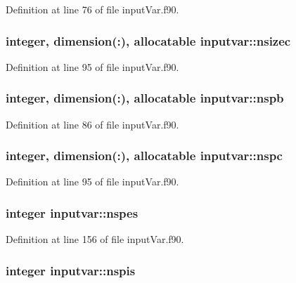 Definition at line 76 of file input\-Var.\-f90.

\hypertarget{classinputvar_af28da5ec88564638bee476f2a37f5308}{
\subsubsection[{nsizec}]{\setlength{\rightskip}{0pt plus 5cm}integer, dimension(\-:), allocatable inputvar\-::nsizec}}\label{classinputvar_af28da5ec88564638bee476f2a37f5308}


Definition at line 95 of file input\-Var.\-f90.

\hypertarget{classinputvar_aa1e78ecd4b3cbb3f08b770cf604a5d3d}{
\subsubsection[{nspb}]{\setlength{\rightskip}{0pt plus 5cm}integer, dimension(\-:), allocatable inputvar\-::nspb}}\label{classinputvar_aa1e78ecd4b3cbb3f08b770cf604a5d3d}


Definition at line 86 of file input\-Var.\-f90.

\hypertarget{classinputvar_aad6ce13b0378ba79e193cb3738e2d938}{
\subsubsection[{nspc}]{\setlength{\rightskip}{0pt plus 5cm}integer, dimension(\-:), allocatable inputvar\-::nspc}}\label{classinputvar_aad6ce13b0378ba79e193cb3738e2d938}


Definition at line 95 of file input\-Var.\-f90.

\hypertarget{classinputvar_a253d7296c6c1f21cd53ed05721bcbbc3}{
\subsubsection[{nspes}]{\setlength{\rightskip}{0pt plus 5cm}integer inputvar\-::nspes}}\label{classinputvar_a253d7296c6c1f21cd53ed05721bcbbc3}


Definition at line 156 of file input\-Var.\-f90.

\hypertarget{classinputvar_ae189f83f0afe8df98cf88452173c782e}{
\subsubsection[{nspis}]{\setlength{\rightskip}{0pt plus 5cm}integer inputvar\-::nspis}}\label{classinputvar_ae189f83f0afe8df98cf88452173c782e}


